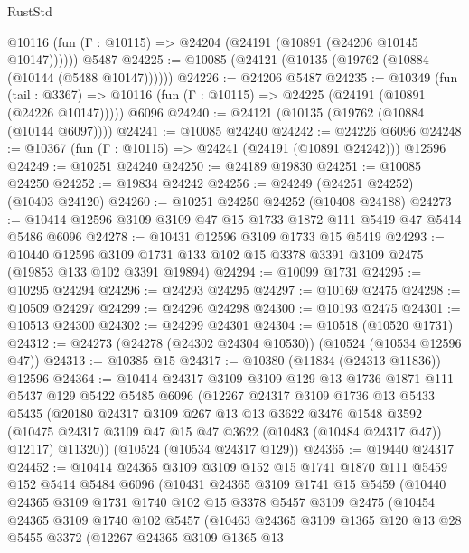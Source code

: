 \begin{lexlean}{RustStd}
\begin{coremodule}
      @10116 (fun (Γ : @10115) => @24204 (@24191 (@10891 (@24206 @10145 @10147))))))
    @5487
@24225 := @10085 (@24121 (@10135 (@19762 (@10884 (@10144 (@5488 @10147))))))
@24226 := @24206 @5487
@24235 := @10349
    (fun (tail : @3367) => @10116 (fun (Γ : @10115) => @24225 (@24191 (@10891 (@24226 @10147)))))
    @6096
@24240 := @24121 (@10135 (@19762 (@10884 (@10144 @6097))))
@24241 := @10085 @24240
@24242 := @24226 @6096
@24248 := @10367 (fun (Γ : @10115) => @24241 (@24191 (@10891 @24242))) @12596
@24249 := @10251 @24240
@24250 := @24189 @19830
@24251 := @10085 @24250
@24252 := @19834 @24242
@24256 := @24249 (@24251 @24252) (@10403 @24120)
@24260 := @10251 @24250 @24252 (@10408 @24188)
@24273 := @10414 @12596 @3109 @3109 @47 @15 @1733 @1872 @111 @5419 @47 @5414 @5486 @6096
@24278 := @10431 @12596 @3109 @1733 @15 @5419
@24293 := @10440
    @12596
    @3109
    @1731
    @133
    @102
    @15
    @3378
    @3391
    @3109
    @2475
    (@19853 @133 @102 @3391 @19894)
@24294 := @10099 @1731
@24295 := @10295 @24294
@24296 := @24293 @24295
@24297 := @10169 @2475
@24298 := @10509 @24297
@24299 := @24296 @24298
@24300 := @10193 @2475
@24301 := @10513 @24300
@24302 := @24299 @24301
@24304 := @10518 (@10520 @1731)
@24312 := @24273 (@24278 (@24302 @24304 @10530)) (@10524 (@10534 @12596 @47))
@24313 := @10385 @15
@24317 := @10380 (@11834 (@24313 @11836)) @12596
@24364 := @10414
    @24317
    @3109
    @3109
    @129
    @13
    @1736
    @1871
    @111
    @5437
    @129
    @5422
    @5485
    @6096
    (@12267
      @24317
      @3109
      @1736
      @13
      @5433
      @5435
      (@20180
        @24317
        @3109
        @267
        @13
        @13
        @3622
        @3476
        @1548
        @3592
        (@10475 @24317 @3109 @47 @15 @47 @3622 (@10483 (@10484 @24317 @47)) @12117)
        @11320))
    (@10524 (@10534 @24317 @129))
@24365 := @19440 @24317
@24452 := @10414
    @24365
    @3109
    @3109
    @152
    @15
    @1741
    @1870
    @111
    @5459
    @152
    @5414
    @5484
    @6096
    (@10431
      @24365
      @3109
      @1741
      @15
      @5459
      (@10440
        @24365
        @3109
        @1731
        @1740
        @102
        @15
        @3378
        @5457
        @3109
        @2475
        (@10454
          @24365
          @3109
          @1740
          @102
          @5457
          (@10463
            @24365
            @3109
            @1365
            @120
            @13
            @28
            @5455
            @3372
            (@12267
              @24365
              @3109
              @1365
              @13

\end{coremodule}
\end{lexlean}

